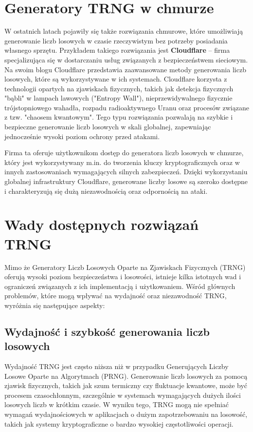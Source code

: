 \section{Generatory TRNG w chmurze}

W ostatnich latach pojawiły się także rozwiązania chmurowe, które umożliwiają generowanie liczb losowych w czasie rzeczywistym bez potrzeby posiadania własnego sprzętu. Przykładem takiego rozwiązania jest \textbf{Cloudflare} – firma specjalizująca się w dostarczaniu usług związanych z bezpieczeństwem sieciowym. Na swoim blogu Cloudflare przedstawia zaawansowane metody generowania liczb losowych, które są wykorzystywane w ich systemach.
Cloudflare korzysta z technologii opartych na zjawiskach fizycznych, takich jak detekcja fizycznych "bąbli" w lampach lawowych ("Entropy Wall"),
nieprzewidywalnego fizycznie trójstopniowego wahadła, rozpadu radioaktywnego Uranu oraz procesów związane z tzw. "chaosem kwantowym".
Tego typu rozwiązania pozwalają na szybkie i bezpieczne generowanie liczb losowych w skali globalnej, zapewniając jednocześnie wysoki poziom ochrony przed atakami.

Firma ta oferuje użytkownikom dostęp do generatora liczb losowych w chmurze, który jest wykorzystywany m.in. do tworzenia kluczy kryptograficznych oraz w innych zastosowaniach wymagających silnych zabezpieczeń. Dzięki wykorzystaniu globalnej infrastruktury Cloudflare, generowane liczby losowe są szeroko dostępne i charakteryzują się dużą niezawodnością oraz odpornością na ataki.

\section{Wady dostępnych rozwiązań TRNG}

Mimo że Generatory Liczb Losowych Oparte na Zjawiskach Fizycznych (TRNG) oferują wysoki poziom bezpieczeństwa i losowości, istnieje kilka istotnych wad i ograniczeń związanych z ich implementacją i użytkowaniem. Wśród głównych problemów, które mogą wpływać na wydajność oraz niezawodność TRNG, wyróżnia się następujące aspekty:

\subsection{Wydajność i szybkość generowania liczb losowych}

Wydajność TRNG jest często niższa niż w przypadku Generujących Liczby Losowe Oparte na Algorytmach (PRNG). Generowanie liczb losowych za pomocą zjawisk fizycznych, takich jak szum termiczny czy fluktuacje kwantowe, może być procesem czasochłonnym, szczególnie w systemach wymagających dużych ilości losowych liczb w krótkim czasie. W wyniku tego, TRNG mogą nie spełniać wymagań wydajnościowych w aplikacjach o dużym zapotrzebowaniu na losowość, takich jak systemy kryptograficzne o bardzo wysokiej częstotliwości operacji.

